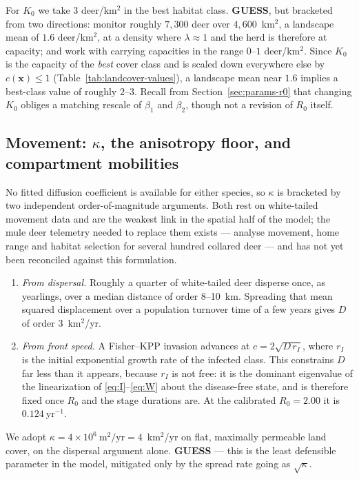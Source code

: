 \documentclass[11pt]{article}
\newcommand{\tagGUESS}{{\footnotesize\textsf{\textbf{\textcolor{red!70!black}{GUESS}}}}}
\begin{document}
For $K_0$ we take $3$ deer/km$^2$ in the best habitat class. \tagGUESS{}, but bracketed from two directions: \citet{Geremia2015} monitor roughly $7{,}300$ deer over $4{,}600$~km$^2$, a landscape mean of $1.6$ deer/km$^2$, at a density where $\lambda \approx 1$ and the herd is therefore at capacity; and \citet{Miller2006} work with carrying capacities in the range $0$--$1$ deer/km$^2$. Since $K_0$ is the capacity of the \emph{best} cover class and is scaled down everywhere else by $c(\mathbf{x})\le1$ (Table~\ref{tab:landcover-values}), a landscape mean near $1.6$ implies a best-class value of roughly $2$--$3$. Recall from Section~\ref{sec:params-r0} that changing $K_0$ obliges a matching rescale of $\beta_1$ and $\beta_2$, though not a revision of $R_0$ itself.

\subsection{Movement: $\kappa$, the anisotropy floor, and compartment mobilities}
\label{sec:params-movement}

No fitted diffusion coefficient is available for either species, so $\kappa$ is bracketed by two independent order-of-magnitude arguments. Both rest on white-tailed movement data and are the weakest link in the spatial half of the model; the mule deer telemetry needed to replace them exists --- \citet{Gilbertson2025} analyse movement, home range and habitat selection for several hundred collared deer --- and has not yet been reconciled against this formulation.
\begin{enumerate}
\item \emph{From dispersal.} Roughly a quarter of white-tailed deer disperse once, as yearlings, over a median distance of order 8--10~km. Spreading that mean squared displacement over a population turnover time of a few years gives $D$ of order $3$~km$^2$/yr.
\item \emph{From front speed.} A Fisher--KPP invasion advances at $c = 2\sqrt{D\,r_I}$, where $r_I$ is the initial exponential growth rate of the infected class. This constrains $D$ far less than it appears, because $r_I$ is not free: it is the dominant eigenvalue of the linearization of \eqref{eq:I}--\eqref{eq:W} about the disease-free state, and is therefore fixed once $R_0$ and the stage durations are. At the calibrated $R_0 = 2.00$ it is $0.124\ \mathrm{yr}^{-1}$.
\end{enumerate}
We adopt $\kappa = 4\times10^{6}\ \mathrm{m}^2/\mathrm{yr} = 4$~km$^2$/yr on flat, maximally permeable land cover, on the dispersal argument alone. \tagGUESS{} --- this is the least defensible parameter in the model, mitigated only by the spread rate going as $\sqrt{\kappa}$.
\end{document}
